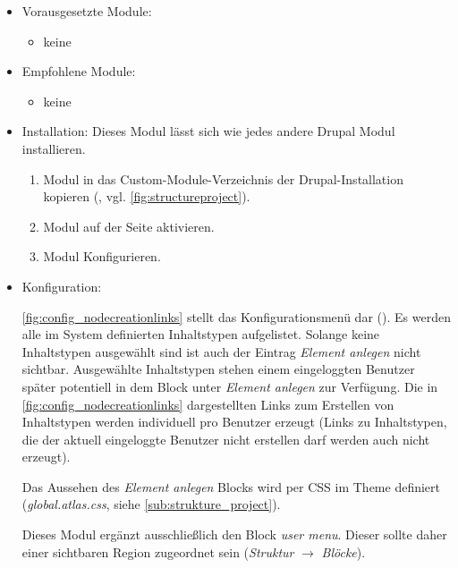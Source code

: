 \begin{itemize}[parsep=0pt, itemsep=5.0pt plus 2.0pt minus 1.0pt, leftmargin=*]
	\item Vorausgesetzte Module:
	\begin{itemize}
		\item keine
	\end{itemize}
	
	\item Empfohlene Module:
	\begin{itemize}
		\item keine
	\end{itemize}
	
	\item Installation: 
	Dieses Modul lässt sich wie jedes andere Drupal Modul installieren.
	\begin{enumerate}
		\item Modul in das Custom-Module-Verzeichnis der Drupal-Installation kopieren  (\zB {}, vgl. \cref{fig:structureproject}).
		\item Modul auf der Seite  aktivieren.
		\item Modul Konfigurieren.
	\end{enumerate}
	
	\item Konfiguration:
	
	\cref{fig:config_nodecreationlinks} stellt das Konfigurationsmenü dar (). Es werden alle im System definierten Inhaltstypen aufgelistet. Solange keine Inhaltstypen ausgewählt sind ist auch der Eintrag \textit{Element anlegen} nicht sichtbar. Ausgewählte Inhaltstypen stehen einem eingeloggten Benutzer später potentiell in dem Block unter \textit{Element anlegen} zur Verfügung. Die in \cref{fig:config_nodecreationlinks} dargestellten Links zum Erstellen von Inhaltstypen werden individuell pro Benutzer erzeugt (Links zu Inhaltstypen, die der aktuell eingeloggte Benutzer nicht erstellen darf werden auch nicht erzeugt). 
	
	Das Aussehen des \textit{Element anlegen} Blocks wird per CSS im Theme definiert (\zB \textit{global.atlas.css}, siehe \cref{sub:strukture_project}).
	
	Dieses Modul ergänzt ausschließlich den Block \textit{user menu}. Dieser sollte daher einer sichtbaren Region zugeordnet sein (\textit{Struktur} $\rightarrow$ \textit{Blöcke}).
	
\end{itemize}




